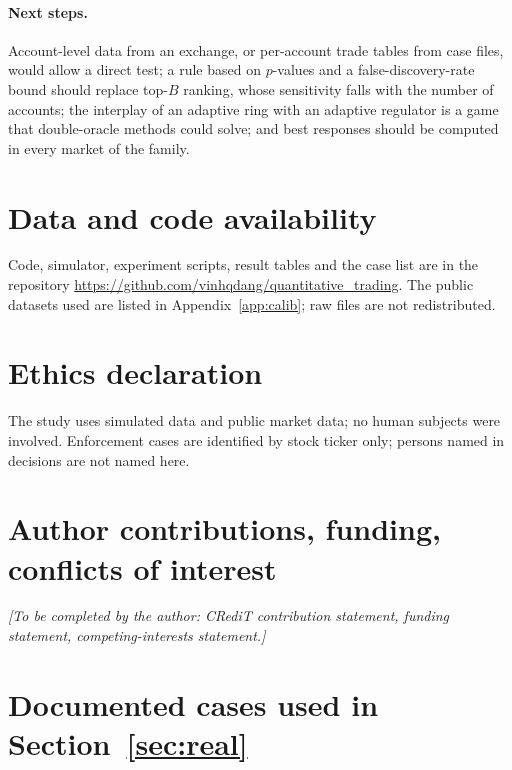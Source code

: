 \documentclass[11pt,a4paper]{article}
\begin{document}
\paragraph{Next steps.} Account-level data from an exchange, or per-account trade tables from case files, would allow a direct test; a rule based on $p$-values and a false-discovery-rate bound should replace top-$B$ ranking, whose sensitivity falls with the number of accounts; the interplay of an adaptive ring with an adaptive regulator is a game that double-oracle methods could solve; and best responses should be computed in every market of the family.

\section*{Data and code availability}
Code, simulator, experiment scripts, result tables and the case list are in the repository \url{https://github.com/vinhqdang/quantitative_trading}. The public datasets used are listed in Appendix~\ref{app:calib}; raw files are not redistributed.

\section*{Ethics declaration}
The study uses simulated data and public market data; no human subjects were involved. Enforcement cases are identified by stock ticker only; persons named in decisions are not named here.

\section*{Author contributions, funding, conflicts of interest}
\textit{[To be completed by the author: CRediT contribution statement, funding statement, competing-interests statement.]}

\appendix
\section{Documented cases used in Section~\ref{sec:real}}\label{app:cases}
\begin{table}[h]
\centering\footnotesize
{}
\caption{Cases with exact dates of the conduct. The periods are from press reports quoting the State Securities Commission decisions (sources are listed in the repository file \texttt{data/cases.csv}); the decision documents were not opened. FIR was the subject of two decisions with the same period and is counted once. PSH was traded on the negotiated system.}
\end{table}
\end{document}
